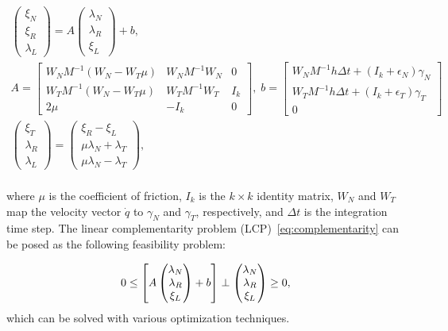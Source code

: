 \begin{gather*}
  \begin{pmatrix}
    \xi_N \\
    \xi_R \\
    \lambda_L
  \end{pmatrix} =
      A
    \begin{pmatrix}
      \lambda_N \\
      \lambda_R \\
      \xi_L
    \end{pmatrix} + b, \\
    A = \begin{bmatrix}
      W_N M^{-1} (W_N - W_T \mu) & W_N M^{-1} W_N & 0  \\
      W_T M^{-1} (W_N - W_T \mu) & W_T M^{-1} W_T & I_k  \\
      2\mu & -I_k & 0
    \end{bmatrix}, \;  b = \begin{bmatrix}
      W_N M^{-1} h \Delta t + (I_k+\epsilon_N) \gamma_N\\
      W_T M^{-1} h \Delta t + (I_k+\epsilon_T) \gamma_T\\
      0
    \end{bmatrix} \\
    \begin{pmatrix}
      \xi_T   \\
      \lambda_R \\
      \lambda_L 
    \end{pmatrix} = 
    \begin{pmatrix}
      \xi_R - \xi_L \\
      \mu \lambda_N + \lambda_T  \\
      \mu \lambda_N - \lambda_T  
    \end{pmatrix}, \\
\end{gather*}
 
\noindent where $\mu$ is the coefficient of friction, $I_k$ is the $k \times k$ identity
matrix, $W_N$ and $W_T$ map the velocity vector $\dot{q}$ to $\gamma_N$ and
$\gamma_T$, respectively, and $\Delta t$ is the integration time step.
%
The linear complementarity problem (LCP)~\eqref{eq:complementarity} can be posed as
the following feasibility problem:

\begin{equation}
    0 \leq 
    \left[ A \begin{pmatrix}
      \lambda_N \\
      \lambda_R \\
      \xi_L
    \end{pmatrix} + b \right]
    \perp
    \begin{pmatrix}
      \lambda_N \\
      \lambda_R \\
      \xi_L
    \end{pmatrix} \geq 0, \\
  \label{eq:feasibility} 
\end{equation}
\noindent which can be solved with various optimization techniques. 

